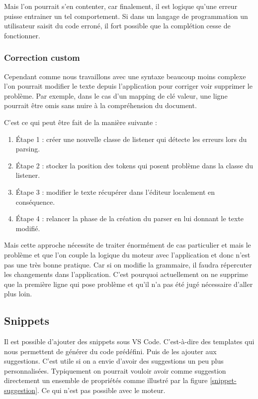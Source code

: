 \documentclass[
    iict, %
    il, %
]{heig-tb}
\begin{document}
Mais l'on pourrait s'en contenter, car finalement, il est logique qu'une erreur puisse entrainer un tel comportement.
Si dans un langage de programmation un utilisateur saisit du code erroné, il fort possible que la complétion cesse de fonctionner.

\subsubsection{Correction custom}
Cependant comme nous travaillons avec une syntaxe beaucoup moins complexe l'on pourrait modifier le texte depuis l'application pour corriger voir supprimer le problème.
Par exemple, dans le cas d'un mapping de clé valeur, une ligne pourrait être omis sans nuire à la compréhension du document.

C'est ce qui peut être fait de la manière suivante :
\begin{enumerate}
    \item Étape 1 : créer une nouvelle classe de listener qui détecte les erreurs lors du parsing.
    \item Étape 2 : stocker la position des tokens qui posent problème dans la classe du listener.
    \item Étape 3 : modifier le texte récupérer dans l'éditeur localement en conséquence.
    \item Étape 4 : relancer la phase de la création du parser en lui donnant le texte modifié.
\end{enumerate}

Mais cette approche nécessite de traiter énormément de cas particulier et mais le problème et que l'on couple la logique du moteur avec l'application et donc n'est pas une très bonne pratique.
Car si on modifie la grammaire, il faudra répercuter les changements dans l'application.
C'est pourquoi actuellement on ne supprime que la première ligne qui pose problème et qu'il n'a pas été jugé nécessaire d'aller plus loin.

\subsection{Snippets}
Il est possible d'ajouter des snippets sous VS Code. C'est-à-dire des templates qui nous permettent de générer du code prédéfini. Puis de les ajouter aux suggestions.
C'est utile si on a envie d'avoir des suggestions un peu plus personnalisées.
Typiquement on pourrait vouloir avoir comme suggestion directement un ensemble de propriétés comme illustré par la figure \ref*{snippet-suggestion}.
Ce qui n'est pas possible avec le moteur.
\end{document}
